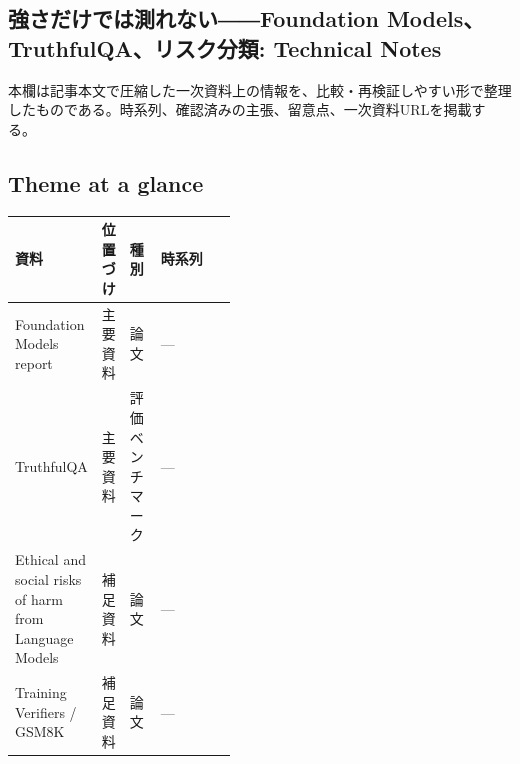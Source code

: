 \subsection*{強さだけでは測れない――Foundation Models、TruthfulQA、リスク分類: Technical Notes}
本欄は記事本文で圧縮した一次資料上の情報を、比較・再検証しやすい形で整理したものである。時系列、確認済みの主張、留意点、一次資料URLを掲載する。
\medskip
\subsection*{Theme at a glance}
\begin{center}
\footnotesize
\begin{tabularx}{\linewidth}{@{}p{0.20\linewidth}p{0.10\linewidth}p{0.14\linewidth}X@{}}
\toprule
資料 & 位置づけ & 種別 & 時系列 \\
\midrule
Foundation Models report & 主要資料 & 論文 & — \\
TruthfulQA & 主要資料 & 評価ベンチマーク & — \\
Ethical and social risks of harm from Language Models & 補足資料 & 論文 & — \\
Training Verifiers / GSM8K & 補足資料 & 論文 & — \\
\bottomrule
\end{tabularx}
\end{center}
\normalsize

